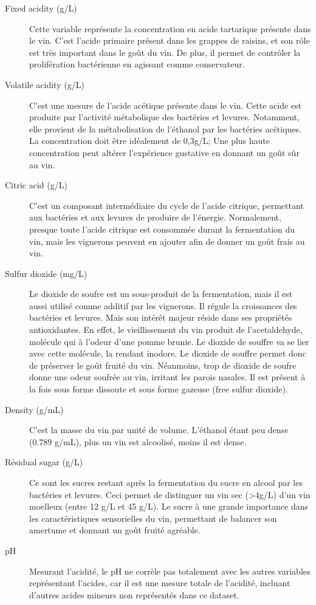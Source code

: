 \documentclass[11pt,a4paper]{article}
\begin{document}
\begin{description}
	\item[Fixed acidity (g/L)] Cette variable représente la concentration en acide tartarique présente dans le vin. C'est l'acide primaire présent dans les grappes de raisins, et son rôle est très important dans le goût du vin. De plus, il permet de contrôler la prolifération bactérienne en agissant comme conservateur.
	\item[Volatile acidity (g/L)] C'est une mesure de l'acide acétique présente dans le vin. Cette acide est produite par l'activité métabolique des bactéries et levures. Notamment, elle provient de la métabolisation de l'éthanol par les bactéries acétiques. La concentration doit être idéalement de 0,3g/L; Une plus haute concentration peut altérer l'expérience gustative en donnant un goût sûr au vin. 
	\item[Citric acid (g/L)] C'est un composant intermédiaire du cycle de l'acide citrique, permettant aux bactéries et aux levures de produire de l'énergie. Normalement, presque toute l'acide citrique est consommée durant la fermentation du vin, mais les vignerons peuvent en ajouter afin de donner un goût frais au vin. 
	\item[Sulfur dioxide (mg/L)] Le dioxide de soufre est un sous-produit de la fermentation, mais il est aussi utilisé comme additif par les vignerons. Il régule la croissances des bactéries et levures. Mais son intérêt majeur réside dans ses propriétés antioxidantes. En effet, le vieillissement du vin produit de l'acetaldehyde, molécule qui à l'odeur d'une pomme brunie. Le dioxide de souffre va se lier avec cette molécule, la rendant inodore. Le dioxide de souffre permet donc de préserver le goût fruité du vin. Néanmoins, trop de dioxide de soufre donne une odeur soufrée au vin, irritant les parois nasales. Il est présent à la fois sous forme dissoute et sous forme gazeuse (free sulfur dioxide).
	\item[Density (g/mL)] C'est la masse du vin par unité de volume. L'éthanol étant peu dense (0.789 g/mL), plus un vin est alcoolisé, moins il est dense. 
	\item[Résidual sugar (g/L)] Ce sont les sucres restant après la fermentation du sucre en alcool par les bactéries et levures. Ceci permet de distinguer un vin sec (>4g/L) d'un vin moelleux (entre 12 g/L et 45 g/L). Le sucre à une grande importance dans les caractéristiques sensorielles du vin, permettant de balancer son amertume et donnant un goût fruité agréable.
	\item[pH] Mesurant l'acidité, le pH ne corrèle pas totalement avec les autres variables représentant l'acides, car il est une mesure totale de l'acidité, incluant d'autres acides mineurs non représentés dans ce dataset.

\end{description}
\end{document}
